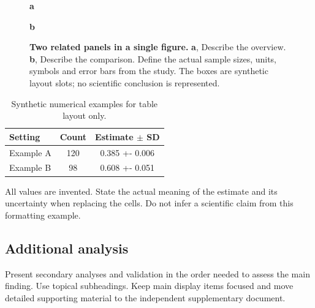\documentclass[pdflatex,sn-nature]{sn-jnl}
\begin{document}
\begin{figure}[htbp]
\centering
\begin{minipage}[t]{0.47\linewidth}
\raggedright\textbf{a}\par\smallskip
{}
\end{minipage}\hfill
\begin{minipage}[t]{0.47\linewidth}
\raggedright\textbf{b}\par\smallskip
{}
\end{minipage}
\caption{\textbf{Two related panels in a single figure.} \textbf{a}, Describe
the overview. \textbf{b}, Describe the comparison. Define the actual sample
sizes, units, symbols and error bars from the study. The boxes are synthetic
layout slots; no scientific conclusion is represented.}
\label{fig:comparison}
\end{figure}

\begin{table}[htbp]
\centering
\caption{Synthetic numerical examples for table layout only.}
\label{tab:comparison}
\small
\begin{tabularx}{\linewidth}{@{}>{\raggedright\arraybackslash}X
  S[table-format=3.0] S[table-format=1.3(3)]@{}}
\toprule
Setting & {Count} & {Estimate $\pm$ SD}\\
\midrule
Example A & 120 & 0.385 +- 0.006\\
Example B & 98 & 0.608 +- 0.051\\
\bottomrule
\end{tabularx}
\par\smallskip\footnotesize\raggedright
All values are invented. State the actual meaning of the estimate and its
uncertainty when replacing the cells. Do not infer a scientific claim from
this formatting example.
\end{table}

\subsection{Additional analysis}
Present secondary analyses and validation in the order needed to assess the
main finding. Use topical subheadings. Keep main display items focused and
move detailed supporting material to the independent supplementary document.
\end{document}
